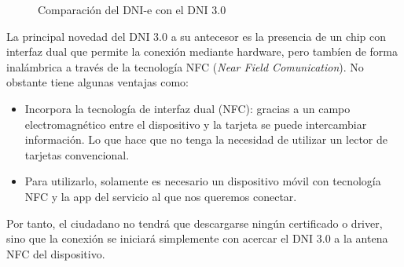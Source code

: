 \documentclass{manual}
\begin{document}
\begin{figure}[H]
	\centering
	\caption{Comparación del DNI-e con el DNI 3.0} 
\end{figure}

La principal novedad del DNI 3.0 a su antecesor es la presencia de un chip con interfaz dual que permite la conexión mediante hardware, pero tambíen de forma inalámbrica a través de la tecnología NFC (\textit{Near Field Comunication}). No obstante tiene algunas ventajas como:

\begin{itemize}
	\item Incorpora la tecnología de interfaz dual (NFC): gracias a un campo electromagnético entre el dispositivo y la tarjeta se puede intercambiar información. Lo que hace que no tenga la necesidad de utilizar un lector de tarjetas convencional.
	\item Para utilizarlo, solamente es necesario un dispositivo móvil con tecnología NFC y la app del servicio al que nos queremos conectar.
\end{itemize}

Por tanto, el ciudadano no tendrá que descargarse ningún certificado o driver, sino que la conexión se iniciará simplemente con acercar el DNI 3.0 a la antena NFC del dispositivo.
\end{document}
